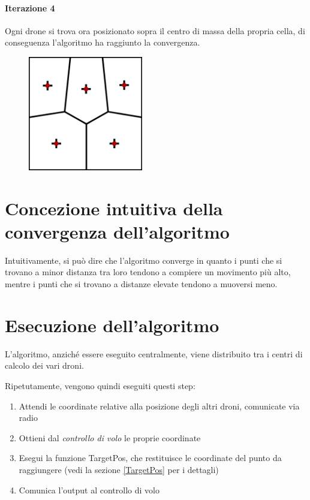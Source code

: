 \documentclass[11pt,a4paper]{report}
\newcommand{\name}[1]{{\ttfamily #1}}
\begin{document}
\paragraph{Iterazione 4}

Ogni drone si trova ora posizionato sopra il centro di massa della propria cella, di conseguenza l'algoritmo ha raggiunto la convergenza.

\begin{figure}[H]
\includegraphics[width=5cm]{lloyd_iterazione_4.png}
\centering
\end{figure}

\section{Concezione intuitiva della convergenza dell'algoritmo}

Intuitivamente, si può dire che l'algoritmo converge in quanto i punti che si trovano a minor distanza tra loro tendono a compiere un movimento più alto, mentre i punti che si trovano a distanze elevate tendono a muoversi meno.

\section{Esecuzione dell'algoritmo}

L'algoritmo, anziché essere eseguito centralmente, viene distribuito tra i centri di calcolo dei vari droni.

Ripetutamente, vengono quindi eseguiti questi step:

\begin{enumerate}
	\item Attendi le coordinate relative alla posizione degli altri droni, comunicate via radio
	\item Ottieni dal \textit{controllo di volo} le proprie coordinate
	\item Esegui la funzione \name{TargetPos}, che restituisce le coordinate del punto da raggiungere (vedi la sezione \ref{TargetPos} per i dettagli)
	\item Comunica l'output al controllo di volo
\end{enumerate}
\end{document}
